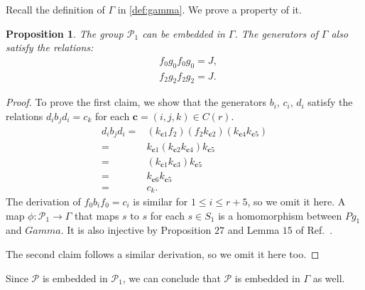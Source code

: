 \documentclass[11pt,letterpaper]{article}
\newcommand{\1}{\mathbb{1}}
\newcommand{\Pg}{\mathcal{P}}
\newcommand{\bc}{\pmb{c}}
\newtheorem{proposition}[theorem]{Proposition}
\theoremstyle{definition}
\begin{document}
Recall the definition of $\Gamma$ in \cref{def:gamma}. We prove a property of it.
\begin{proposition}
    \label{prop:g1gamma}
	The group $\Pg_1$ can be embedded in $\Gamma$.
	The generators of $\Gamma$ also satisfy the relations: 
	\begin{align}
	    \label{eq:mg1} &f_0 g_0 f_0 g_0 = J,\\
	    \label{eq:mg2} &f_2 g_2 f_2 g_2 = J.
	\end{align}
\end{proposition}
\begin{proof}
    To prove the first claim, we show that the generators
    $b_i$, $c_i$, $d_i$ satisfy the relations
    $d_ib_jd_i = c_k$ for each $\bc = (i,j,k) \in C(r)$.
    \begin{align*}
        d_ib_jd_i =& (k_{\bc 1} f_2)(f_2 k_{\bc 2})(k_{\bc 4} k_{\bc 5})\\ 
        =& k_{\bc 1}(k_{\bc 2}k_{\bc 4})k_{\bc 5} \\
        =& (k_{\bc 1} k_{\bc 3}) k_{\bc 5} \\
        =& k_{\bc 6} k_{\bc 5} \\
        =& c_k.
    \end{align*}
    The derivation of $f_0 b_i f_0 = c_i$ is similar for $1 \leq i \leq r+5$, so we omit it here.
    A map $\phi:\Pg_1 \rightarrow \Gamma$ that maps $s$
    to $s$ for each $s \in S_1$ is a homomorphism between $Pg_1$ and 
    $Gamma$. It is also injective by Proposition $27$ and Lemma $15$ of 
    Ref.~\cite{slofstra2017}.
    
    The second claim follows a similar derivation, so we omit it here too.
\end{proof}
Since $\Pg$ is embedded in $\Pg_1$, we can conclude that
$\Pg$ is embedded in $\Gamma$ as well.
\end{document}
